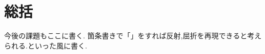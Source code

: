 \chapter{総括}
今後の課題もここに書く. 箇条書きで「」をすれば反射,屈折を再現できると考えられる.といった風に書く.


\begin{comment}
本研究では，Webブラウザ上でInteractiveに操作可能な，分子動力学法による粒子の振る舞いを視覚化するプログラムを作成した．
このプログラムによる成果を以下に記す．

\begin{enumerate}
  \item 分子動力学法による粒子の動きをシミュレーションし視覚化することによって，クラスタや凝固などの現象を視認することができ直感的な理解が可能となった．
また，粒子をマウスで操作できるため，自分の好きなようにシミュレーションでき理解の向上に繋がると考えられる．
  \item プログラムのJavaScript化を行いWebブラウザ上で動作が可能になり容易に公開，利用することができる．
そのため，分子動力学法を学習する者が手軽に扱うことができ，学習意欲，効率の向上に繋がると考えられる．
  \item 作成したプログラムをライブラリとして保存しプログラムの解説を行うことで，プログラムの継続的な発展を可能にした．
また，今後シミュレーションプログラムを作成する際に今回のプログラムをライブラリとして利用し効率よく作成する事が可能である．
\end{enumerate}

\end{comment}



